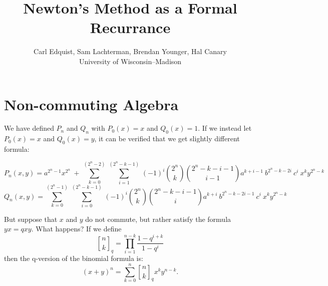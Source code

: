 \documentclass[notitlepage, 10pt]{article}
\title{Newton's Method as a Formal Recurrance}
\author{{\sc 
	Carl Edquist,
	Sam Lachterman,
	Brendan Younger,
	Hal Canary} \\
{\small University of Wisconsin--Madison}}
\newcommand{\binomial}[2]{\genfrac{(}{)}{0pt}{}{ #1 }{ #2 }}
\newcommand{\qbinomial}[2]{\genfrac{[}{]}{0pt}{}{ #1 }{ #2 }_q }
\begin{document}

\maketitle


\section*{Non-commuting Algebra}

We have defined $P_n$ and $Q_n$ with $P_0(x)=x$ and $Q_0(x)=1$.  If we
instead let $P_0(x)=x$ and $Q_0(x)=y$, it can be verified that we get
slightly different formula:

\[
P_n(x,y) = a^{2^n-1}x^{2^n}~+~\sum\limits_{k=0}^{(2^n-2)} 
\sum\limits_{i=1}^{~(2^n-k-1)~} 
(-1)^{i} \binomial{2^n }{ k} \binomial{2^n-k-i-1}{i-1}  
a^{k+i-1}~ b^{2^n-k-2i} ~c^i ~x^k y^{2^n-k}
\]
\[
Q_n(x,y) = \sum\limits_{k=0}^{(2^n-1)}
\sum\limits_{i=0}^{~(2^n-k-1)~} (-1)^i \binomial{2^n}{k} 
\binomial{2^n-k-i-1}{i} 
a^{k+i} ~b^{2^n-k-2i-1} ~c^i ~x^k y^{2^n-k}
\]

But suppose that $x$ and $y$ do not commute, but rather satisfy the
formula $yx=qxy$.  What happens?  If we define
\[ \qbinomial{n }{ k} = \prod_{i=1}^{n-k}
\frac{ 1-q^{i+k} }{ 1-q^i }\]
then the q-version of the binomial formula is: \cite{qbin}
\[
(x + y)^n = \sum_{k=0}^{n} \qbinomial{n }{ k} x^k y^{n-k}.
\]
\end{document}
